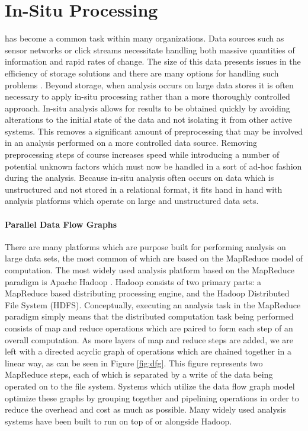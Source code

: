 \section{In-Situ Processing}
\label{sec:insitu}

 has become a common task within many organizations. Data sources such as sensor networks or click streams necessitate handling both massive quantities of information and rapid rates of change. The size of this data presents issues in the efficiency of storage solutions and there are many options for handling such problems \cite{Klasky2011}. Beyond storage, when analysis occurs on large data stores it is often necessary to apply in-situ processing rather than a more thoroughly controlled approach. In-situ analysis allows for results to be obtained quickly by avoiding alterations to the initial state of the data and not isolating it from other active systems. This removes a significant amount of preprocessing that may be involved in an analysis performed on a more controlled data source. Removing preprocessing steps of course increases speed while introducing a number of potential unknown factors which must now be handled in a sort of ad-hoc fashion during the analysis. Because in-situ analysis often occurs on data which is unstructured and not stored in a relational format, it fits hand in hand with analysis platforms which operate on large and unstructured data sets.

\paragraph{Parallel Data Flow Graphs}
There are many platforms which are purpose built for performing analysis on large data sets, the most common of which are based on the MapReduce model of computation. The most widely used analysis platform based on the MapReduce paradigm is Apache Hadoop \cite{ApacheSoftwareFoundation2015}. Hadoop consists of two primary parts: a MapReduce based distributing processing engine, and the Hadoop Distributed File System (HDFS). Conceptually, executing an analysis task in the MapReduce paradigm simply means that the distributed computation task being performed consists of map and reduce operations which are paired to form each step of an overall computation. As more layers of map and reduce steps are added, we are left with a directed acyclic graph of operations which are chained together in a linear way, as can be seen in  Figure \ref{fig:dfg}. This figure represents two MapReduce steps, each of which is separated by a write of the data being operated on to the file system. Systems which utilize the data flow graph model optimize these graphs by grouping together and pipelining operations in order to reduce the overhead and cost as much as possible. Many widely used analysis systems have been built to run on top of or alongside Hadoop.

